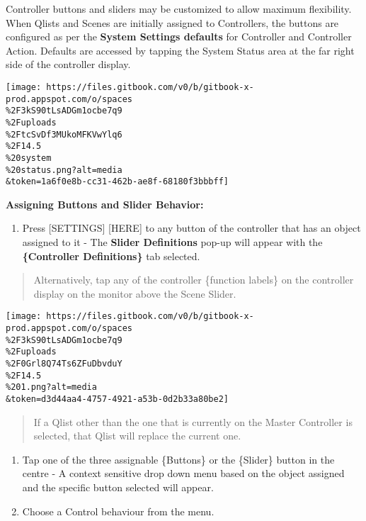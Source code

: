 \documentclass[
]{article}
\providecommand{\tightlist}{%
  \setlength{\itemsep}{0pt}\setlength{\parskip}{0pt}}
\begin{document}
Controller buttons and sliders may be customized to allow maximum flexibility. When Qlists and Scenes are initially assigned to Controllers, the buttons are configured as per the \textbf{System Settings defaults} for Controller and Controller Action. Defaults are accessed by tapping the System Status area at the far right side of the controller display.

\hspace{0pt}

\texttt{[image: https://files.gitbook.com/v0/b/gitbook-x-prod.appspot.com/o/spaces\\\%2F3kS90tLsADGm1ocbe7q9\\\%2Fuploads\\\%2FtcSvDf3MUkoMFKVwYlq6\\\%2F14.5\\\%20system\\\%20status.png?alt=media\\\&token=1a6f0e8b-cc31-462b-ae8f-68180f3bbbff]}

\hspace{0pt}

\textbf{Assigning Buttons and Slider Behavior:}

\begin{enumerate}
\def\labelenumi{\arabic{enumi}.}
\tightlist
\item
  Press {[}SETTINGS{]} {[}HERE{]} to any button of the controller that has an object assigned to it - The \textbf{Slider Definitions} pop-up will appear with the \textbf{\{Controller Definitions\}} tab selected.
\end{enumerate}

\begin{quote}
Alternatively, tap any of the controller \{function labels\} on the controller display on the monitor above the Scene Slider.
\end{quote}

\texttt{[image: https://files.gitbook.com/v0/b/gitbook-x-prod.appspot.com/o/spaces\\\%2F3kS90tLsADGm1ocbe7q9\\\%2Fuploads\\\%2F0Grl8Q74Ts6ZFuDbvduY\\\%2F14.5\\\%201.png?alt=media\\\&token=d3d44aa4-4757-4921-a53b-0d2b33a80be2]}

\begin{quote}
{If a Qlist other than the one that is currently on the Master Controller is selected, that Qlist will replace the current one.}
\end{quote}

\begin{enumerate}
\def\labelenumi{\arabic{enumi}.}
\setcounter{enumi}{1}
\item
  Tap one of the three assignable \{Buttons\} or the \{Slider\} button in the centre - A context sensitive drop down menu based on the object assigned and the specific button selected will appear.
\item
  Choose a Control behaviour from the menu.
\end{enumerate}
\end{document}
